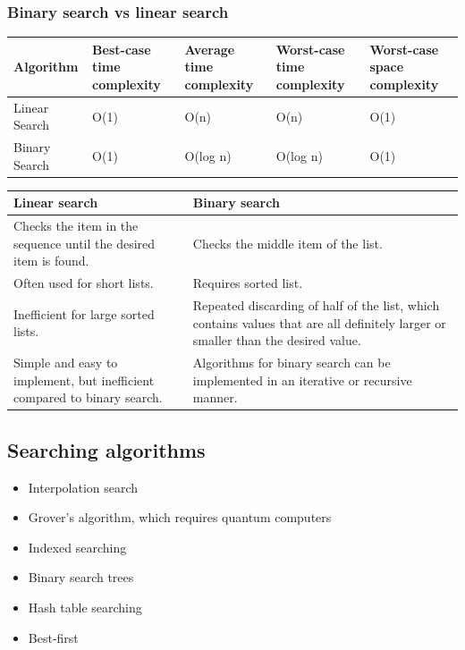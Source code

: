 \documentclass[11pt]{article}
\begin{document}
 \newpage

\subsubsection{Binary search vs linear search}
\label{sec:org6f4420f}
\begin{center}
\begin{tabular}{|m{6.5em}|m{5em}|m{7em}|m{6em}|m{6em}|}
\hline
\textbf{Algorithm} & \textbf{Best-case time complexity} & \textbf{Average time complexity} & \textbf{Worst-case time complexity} & \textbf{Worst-case space complexity}\\[0pt]
\hline
Linear Search & O(1) & O(n) & O(n) & O(1)\\[0pt]
Binary Search & O(1) & O(log n) & O(log n) & O(1)\\[0pt]
\hline
\end{tabular}
\end{center}

\begin{center}
\begin{tabular}{|m{17em}|m{17em}|}
\hline
\textbf{Linear search} & \textbf{Binary search}\\[0pt]
\hline
Checks the item in the sequence until the desired item is found. & Checks the middle item of the list.\\[0pt]
\hline
Often used for short lists. & Requires sorted list.\\[0pt]
\hline
Inefficient for large sorted lists. & Repeated discarding of half of the list, which contains values that are all definitely larger or smaller than the desired value.\\[0pt]
\hline
Simple and easy to implement, but inefficient compared to binary search. & Algorithms for binary search can be implemented in an iterative or recursive manner.\\[0pt]
\hline
\end{tabular}
\end{center}

\subsection{Searching algorithms}
\label{sec:org308e10d}
\begin{itemize}
\item Interpolation search
\item Grover's algorithm, which requires quantum computers
\item Indexed searching
\item Binary search trees
\item Hash table searching
\item Best-first
\end{itemize}
\end{document}
